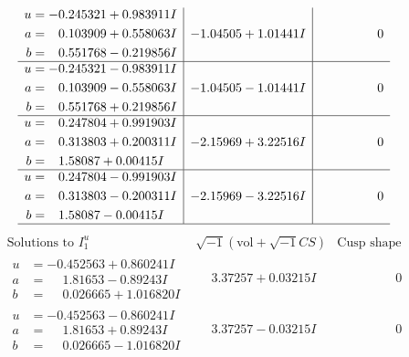\documentclass[1p]{elsarticle_modified}
\theoremstyle{definition}
\newcommand{\I}{\sqrt{-1}}
\begin{document}
$$\begin{array}{c|c|c}
\begin{aligned}
u &= -0.245321 + 0.983911 I \\
a &= \phantom{-}0.103909 + 0.558063 I \\
b &= \phantom{-}0.551768 - 0.219856 I\end{aligned}
 & -1.04505 + 1.01441 I & \phantom{-0.000000 } 0 \\ \hline\begin{aligned}
u &= -0.245321 - 0.983911 I \\
a &= \phantom{-}0.103909 - 0.558063 I \\
b &= \phantom{-}0.551768 + 0.219856 I\end{aligned}
 & -1.04505 - 1.01441 I & \phantom{-0.000000 } 0 \\ \hline\begin{aligned}
u &= \phantom{-}0.247804 + 0.991903 I \\
a &= \phantom{-}0.313803 + 0.200311 I \\
b &= \phantom{-}1.58087 + 0.00415 I\end{aligned}
 & -2.15969 + 3.22516 I & \phantom{-0.000000 } 0 \\ \hline\begin{aligned}
u &= \phantom{-}0.247804 - 0.991903 I \\
a &= \phantom{-}0.313803 - 0.200311 I \\
b &= \phantom{-}1.58087 - 0.00415 I\end{aligned}
 & -2.15969 - 3.22516 I & \phantom{-0.000000 } 0\\
 \hline 
 \end{array}$$\newpage$$\begin{array}{c|c|c}  
\text{Solutions to }I^u_{1}& \I (\text{vol} + \sqrt{-1}CS) & \text{Cusp shape}\\
 \hline 
\begin{aligned}
u &= -0.452563 + 0.860241 I \\
a &= \phantom{-}1.81653 - 0.89243 I \\
b &= \phantom{-}0.026665 + 1.016820 I\end{aligned}
 & \phantom{-}3.37257 + 0.03215 I & \phantom{-0.000000 } 0 \\ \hline\begin{aligned}
u &= -0.452563 - 0.860241 I \\
a &= \phantom{-}1.81653 + 0.89243 I \\
b &= \phantom{-}0.026665 - 1.016820 I\end{aligned}
 & \phantom{-}3.37257 - 0.03215 I & \phantom{-0.000000 } 0 \\ \hline\begin{aligned}

\end{aligned}
\end{array}$$
\end{document}
